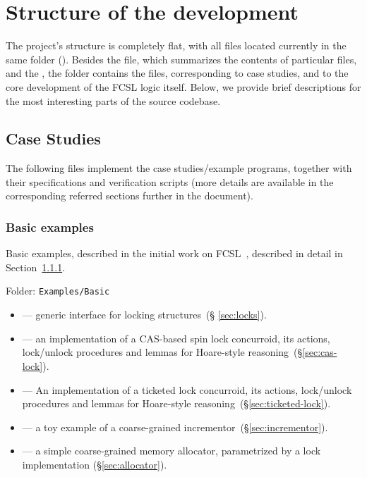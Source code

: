 \section{Structure of the development}
\label{sec:structure}

The project's structure is completely flat, with all files located
currently in the same folder (). Besides the
 file, which summarizes the contents of particular files,
and the , the folder contains the files, corresponding
to case studies, and to the core development of the FCSL logic itself.
%
Below, we provide brief descriptions for the most interesting parts of
the source codebase.

\subsection{Case Studies}
\label{sec:case-studies-files}

The following files implement the case studies/example programs,
together with their specifications and verification scripts (more
details are available in the corresponding referred sections further
in the document).


\subsubsection{Basic examples}
\label{sec:basic-examples}

Basic examples, described in the initial work on
FCSL~\cite{Nanevski-al:ESOP14}, described in detail in
Section~\ref{sec:basic-examples}.

Folder: \texttt{Examples/Basic}

\begin{itemize}

\item {} --- generic interface for locking structures~(\S
  \ref{sec:locks}).

\item {} --- an implementation of a CAS-based spin lock
  concurroid, its actions, lock/unlock procedures and lemmas for
  Hoare-style reasoning~(\S \ref{sec:cas-lock}).

\item {} --- An implementation of a ticketed lock
  concurroid, its actions, lock/unlock procedures and lemmas for
  Hoare-style reasoning~(\S \ref{sec:ticketed-lock}).

\item {} --- a toy example of a coarse-grained
  incrementor~(\S \ref{sec:incrementor}).

\item {} --- a simple coarse-grained memory allocator,
  parametrized by a lock implementation (\S \ref{sec:allocator}).

\end{itemize}

